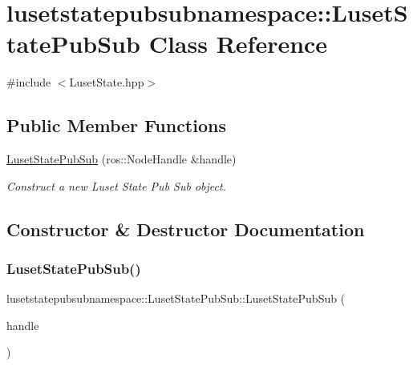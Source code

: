 \hypertarget{classlusetstatepubsubnamespace_1_1LusetStatePubSub}{}\section{lusetstatepubsubnamespace\+:\+:Luset\+State\+Pub\+Sub Class Reference}
\label{classlusetstatepubsubnamespace_1_1LusetStatePubSub}


{\ttfamily \#include $<$Luset\+State.\+hpp$>$}

\subsection*{Public Member Functions}
\begin{DoxyCompactItemize}
\item 
\hyperlink{classlusetstatepubsubnamespace_1_1LusetStatePubSub_a2a886fe36072544f5c186982449e5f61}{Luset\+State\+Pub\+Sub} (ros\+::\+Node\+Handle \&handle)
\begin{DoxyCompactList}\small\item\em Construct a new Luset State Pub Sub object. \end{DoxyCompactList}\end{DoxyCompactItemize}


\subsection{Constructor \& Destructor Documentation}
\mbox{\label{classlusetstatepubsubnamespace_1_1LusetStatePubSub_a2a886fe36072544f5c186982449e5f61}} 
\subsubsection{\texorpdfstring{Luset\+State\+Pub\+Sub()}{LusetStatePubSub()}}
{\footnotesize\ttfamily lusetstatepubsubnamespace\+::\+Luset\+State\+Pub\+Sub\+::\+Luset\+State\+Pub\+Sub (\begin{DoxyParamCaption}\item[{ros\+::\+Node\+Handle \&}]{handle }\end{DoxyParamCaption})}



